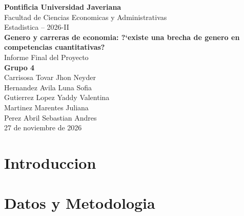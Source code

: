 \documentclass[11pt, a4paper]{article}
\begin{document}
\begin{center}
{\Large \textbf{Pontificia Universidad Javeriana}}\\[0.3cm]
Facultad de Ciencias Economicas y Administrativas\\[0.3cm]
Estadistica -- 2026-II\\[1cm]
{\LARGE \textbf{Genero y carreras de economia: ?`existe una brecha de genero en competencias cuantitativas?}}\\[0.5cm]
{\large Informe Final del Proyecto}\\[1cm]
\textbf{Grupo 4}\\[0.3cm]
Carrisosa Tovar Jhon Neyder\\
Hernandez Avila Luna Sofia\\
Gutierrez Lopez Yaddy Valentina\\
Martinez Marentes Juliana\\
Perez Abril Sebastian Andres\\[1cm]
27 de noviembre de 2026
\end{center}

\newpage
\tableofcontents
\newpage

\section{Introduccion}

\section{Datos y Metodologia}
\end{document}
